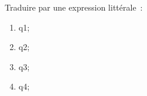 \documentclass[exercice]{thedocument}%
\begin{document}
%
    Traduire par une expression littérale~:
    \begin{enumerate}
        \item \<q1;
        \item \<q2;
        \item \<q3;
        \item \<q4;
    \end{enumerate}
\end{document}
